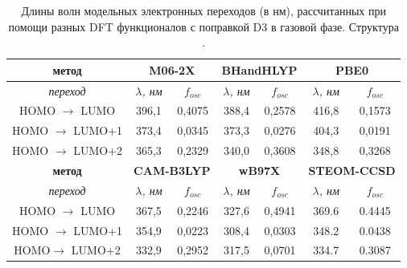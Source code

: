 \documentclass[a4paper,12pt]{article}
\newcommand{\rarr}{\rightarrow}
\begin{document}
\begin{onehalfspace}
		\begin{table}[H]
				\caption{Длины волн модельных электронных переходов (в нм), рассчитанных при помощи разных DFT функционалов с поправкой D3 в газовой фазе. Структура .}
				\label{tab7}
				\centering
					\begin{tabular}{|c|cc|cc|cc|}
					\hline
					\textbf{метод} & \multicolumn{2}{c|}{\textbf{M06-2X}}                       & \multicolumn{2}{c|}{\textbf{BHandHLYP}}                    & \multicolumn{2}{c|}{\textbf{PBE0}}                                              \\ \hline
					\textit{переход}                  & \multicolumn{1}{c|}{\textit{$\lambda$, нм}} & \textit{$f_{osc}$} & \multicolumn{1}{c|}{\textit{$\lambda$, нм}} & \textit{$f_{osc}$} & \multicolumn{1}{c|}{\textit{$\lambda$, нм}} & \textit{$f_{osc}$} \\ \hline
					HOMO $\rarr$ LUMO   & \multicolumn{1}{c|}{396,1}               & 0,4075          & \multicolumn{1}{c|}{388,4}               & 0,2578          & \multicolumn{1}{c|}{416,8}               & \multicolumn{1}{c|}{0,1573}          \\ \hline
					HOMO $\rarr$ LUMO+1 & \multicolumn{1}{c|}{373,4}               & 0,0345          & \multicolumn{1}{c|}{373,3}               & 0,0276          & \multicolumn{1}{c|}{404,3}               & \multicolumn{1}{c|}{0,0191}          \\ \hline
					HOMO $\rarr$ LUMO+2 & \multicolumn{1}{c|}{365,3}               & 0,2329          & \multicolumn{1}{c|}{340,0}               & 0,3608          & \multicolumn{1}{c|}{348,8}               & \multicolumn{1}{c|}{0,3268}          \\ \hline \hline
					\textbf{метод}& \multicolumn{2}{c|}{\textbf{CAM-B3LYP}}  & \multicolumn{2}{c|}{\textbf{wB97X}}     &   \multicolumn{2}{c|}{\textbf{STEOM-CCSD}}                                  \\ \hline
					\textit{переход}                  & \multicolumn{1}{c|}{\textit{$\lambda$, нм}} & \textit{$f_{osc}$} & \multicolumn{1}{c|}{\textit{$\lambda$, нм}} & \textit{$f_{osc}$} & \multicolumn{1}{c|}{\textit{$\lambda$, нм}} & \textit{$f_{osc}$}  \\ \hline
					HOMO $\rarr$ LUMO   & \multicolumn{1}{c|}{367,5}               & 0,2246          & \multicolumn{1}{c|}{327,6}               & 0,4941          & \multicolumn{1}{c|}{369.6}               & \multicolumn{1}{c|}{0.4445}          \\ \hline
					HOMO $\rarr$ LUMO+1 & \multicolumn{1}{c|}{354,9}               & 0,0223          & \multicolumn{1}{c|}{308,4}               & 0,0303          & \multicolumn{1}{c|}{348.2}               & \multicolumn{1}{c|}{0.0438}          \\ \hline
					HOMO$\rarr$ LUMO+2 & \multicolumn{1}{c|}{332,9}               & 0,2952          & \multicolumn{1}{c|}{317,5}               & 0,0701          & \multicolumn{1}{c|}{334.7}               & \multicolumn{1}{c|}{0.3087}          \\ \hline
				\end{tabular}
			\end{table}
		

\end{onehalfspace}
\end{document}
